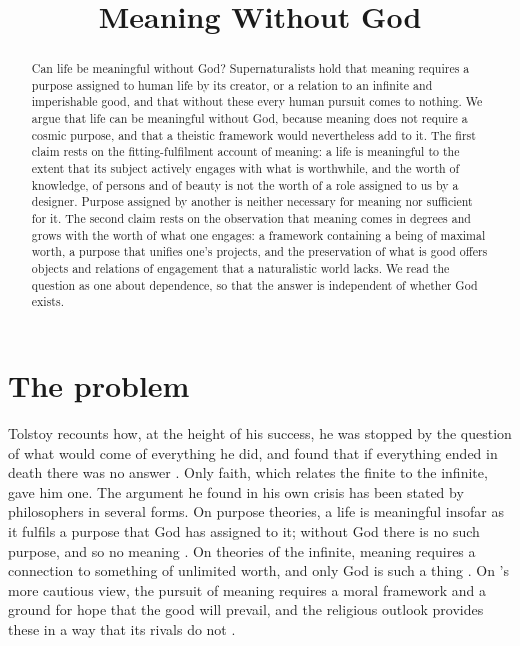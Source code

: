 \documentclass{situationist-preprint}
\title{Meaning Without God}
\begin{document}
\maketitle

\begin{abstract}
Can life be meaningful without God? Supernaturalists hold that meaning requires a purpose assigned to human life by its creator, or a relation to an infinite and imperishable good, and that without these every human pursuit comes to nothing. We argue that life can be meaningful without God, because meaning does not require a cosmic purpose, and that a theistic framework would nevertheless add to it. The first claim rests on the fitting-fulfilment account of meaning: a life is meaningful to the extent that its subject actively engages with what is worthwhile, and the worth of knowledge, of persons and of beauty is not the worth of a role assigned to us by a designer. Purpose assigned by another is neither necessary for meaning nor sufficient for it. The second claim rests on the observation that meaning comes in degrees and grows with the worth of what one engages: a framework containing a being of maximal worth, a purpose that unifies one's projects, and the preservation of what is good offers objects and relations of engagement that a naturalistic world lacks. We read the question as one about dependence, so that the answer is independent of whether God exists.
\end{abstract}

\section{The problem}

Tolstoy recounts how, at the height of his success, he was stopped by the question of what would come of everything he did, and found that if everything ended in death there was no answer \citep{Tolstoy1882}. Only faith, which relates the finite to the infinite, gave him one. The argument he found in his own crisis has been stated by philosophers in several forms. On purpose theories, a life is meaningful insofar as it fulfils a purpose that God has assigned to it; without God there is no such purpose, and so no meaning \citep{Craig2008}. On theories of the infinite, meaning requires a connection to something of unlimited worth, and only God is such a thing \citep[ch.~6]{Nozick1981}. On \citeauthor{Cottingham2003}'s more cautious view, the pursuit of meaning requires a moral framework and a ground for hope that the good will prevail, and the religious outlook provides these in a way that its rivals do not \citep{Cottingham2003}.
\end{document}

